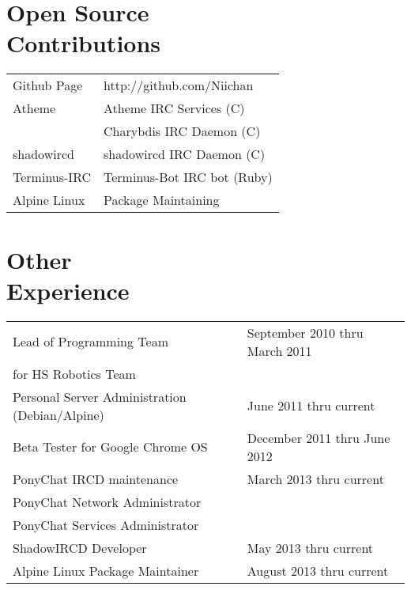 \documentclass[line, margin]{res}
\begin{document}
\address{12924 SE 26th ST \\ Bellevue WA, 98005 \\ +1 (425) 221-7761}
     
\begin{resume}

\section{Open Source \\ Contributions}
\begin{tabular}{l l}
 Github Page & \hfill http://github.com/Niichan \\ [5pt]
 Atheme & \hfill Atheme IRC Services (C) \\ 
 & \hfill Charybdis IRC Daemon (C) \\ [5pt]
 shadowircd & \hfill shadowircd IRC Daemon (C) \\ [5pt]
 Terminus-IRC & \hfill Terminus-Bot IRC bot (Ruby) \\ [5pt]
 Alpine Linux & \hfill Package Maintaining \\
\end{tabular}

\section{Other \\ Experience}
\begin{tabular}{l l}
 Lead of Programming Team & \hfill September 2010 thru March 2011 \\ 
 for HS Robotics Team & \\ [6pt]
 Personal Server Administration (Debian/Alpine) & \hfill June 2011 thru current  \\ [6pt]
 Beta Tester for Google Chrome OS & \hfill December 2011 thru June 2012 \\ [6pt]
 PonyChat IRCD maintenance & \hfill March 2013 thru current \\ 
 PonyChat Network Administrator & \hfill \\ 
 PonyChat Services Administrator & \hfill \\ [6pt]
 ShadowIRCD Developer & \hfill May 2013 thru current \\ [6pt]
 Alpine Linux Package Maintainer & \hfill August 2013 thru current \\ 
\end{tabular}
   

\end{resume}
\end{document}
